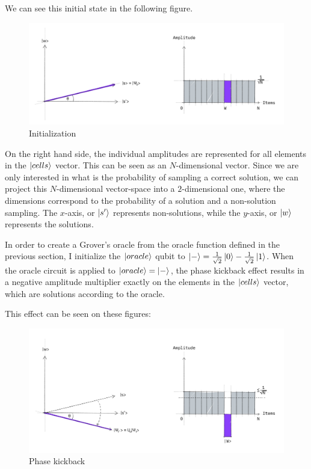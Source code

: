 We can see this initial state in the following figure.

\begin{figure}[H]
  \centering
    \includegraphics[width=\linewidth]{content/assets/03_grovers_algorithm/grover_step1.jpg}
    \caption{Initialization\cite{GroverQiskitTextbook}}
\end{figure}

On the right hand side, the individual amplitudes are represented for all elements in the $\ket{cells}$ vector. This can be seen as an $N$-dimensional vector. Since we are only interested in what is the probability of sampling a correct solution, we can project this $N$-dimensional vector-space into a $2$-dimensional one, where the dimensions correspond to the probability of a solution and a non-solution sampling. The $x$-axis, or $\ket{s'}$ represents non-solutions, while the $y$-axis, or $\ket{w}$ represents the solutions.

In order to create a Grover's oracle from the oracle function defined in the previous section, I initialize the $\ket{oracle}$ qubit to $\ket{-} = \frac{1}{\sqrt{2}}\ket{0} - \frac{1}{\sqrt{2}}\ket{1}$. When the oracle circuit is applied to $\ket{oracle} = \ket{-}$, the phase kickback effect results in a negative amplitude multiplier exactly on the elements in the $\ket{cells}$ vector, which are solutions according to the oracle.

This effect can be seen on these figures:

\begin{figure}[H]
  \centering
    \includegraphics[width=\linewidth]{content/assets/03_grovers_algorithm/grover_step2.jpg}
    \caption{Phase kickback\cite{GroverQiskitTextbook}}
\end{figure}

